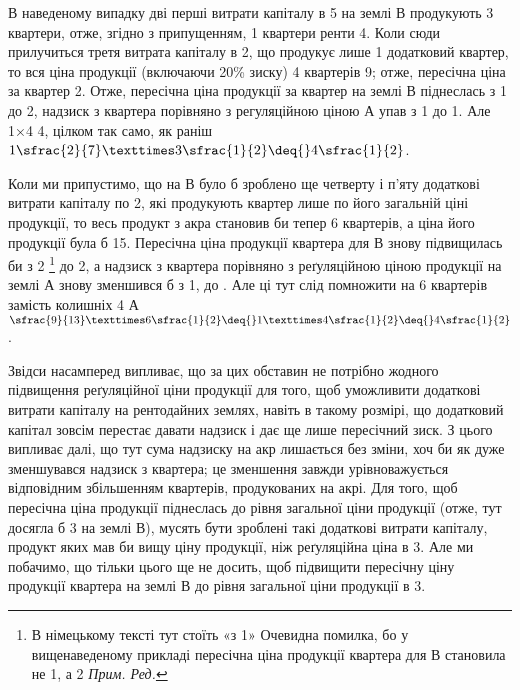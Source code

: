 В наведеному випадку дві перші витрати капіталу в 5 на землі $В$
продукують 3 квартери, отже, згідно з припущенням, 1
квартери ренти \deq{} 4. Коли сюди прилучиться третя витрата
капіталу в 2,
що продукує лише 1 додатковий квартер, то вся ціна продукції (включаючи 20\%
зиску) 4 квартерів \deq{} 9; отже, пересічна ціна за
квартер \deq{} 2. Отже, пересічна ціна продукції за квартер на землі $В$
піднеслась з 1
до 2, надзиск з квартера порівняно з регуляційною ціною $А$ упав
з 1 до 1. Але 1×4 \deq{} 4, цілком так само,
як раніш $1\sfrac{2}{7} × 3\sfrac{1}{2} \deq{} 4\sfrac{1}{2}$.

Коли ми припустимо, що на $В$ було б зроблено ще четверту і п’яту додаткові
витрати капіталу по 2, які продукують квартер лише по його
загальній ціні продукції, то весь продукт з акра становив би тепер 6 квартерів,
а ціна його продукції була б 15. Пересічна ціна продукції
квартера для $В$ знову підвищилась би з 2
\footnote*{В німецькому тексті тут стоїть «з 1» Очевидна помилка,
бо у вищенаведеному прикладі пересічна ціна продукції квартера для $В$
становила не 1, а 2 \emph{Прим. Ред.}}
до 2, а надзиск з квартера
порівняно з реґуляційною ціною продукції на землі $А$ знову зменшився
б з 1, до . Але ці  тут слід
помножити на 6 квартерів замість колишніх 4
$А$ $\sfrac{9}{13}×6\sfrac{1}{2} \deq{} 1× 4\sfrac{1}{2} \deq{} 4\sfrac{1}{2}$.

Звідси насамперед випливає, що за цих обставин не потрібно жодного підвищення
реґуляційної ціни продукції для того, щоб уможливити додаткові витрати
капіталу на рентодайних землях, навіть в такому розмірі, що додатковий
капітал зовсім перестає давати надзиск і дає ще лише пересічний зиск. З
цього випливає далі, що тут сума надзиску на акр лишається без зміни,
хоч би як дуже зменшувався надзиск з квартера; це зменшення завжди урівноважується
відповідним збільшенням квартерів, продукованих на акрі. Для того,
щоб пересічна ціна продукції піднеслась до рівня загальної ціни продукції (отже,
тут досягла б 3 на землі $В$), мусять бути зроблені такі додаткові витрати
капіталу, продукт яких мав би вищу ціну продукції, ніж реґуляційна ціна
в 3. Але ми побачимо, що тільки цього ще не досить, щоб підвищити
пересічну ціну продукції квартера на землі $В$ до рівня загальної ціни продукції
в 3.

